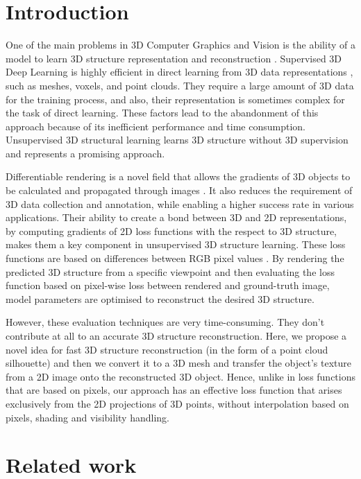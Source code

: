 \documentclass[runningheads]{llncs}
\begin{document}
\section{Introduction}
One of the main problems in 3D Computer Graphics and Vision is the ability of a model to learn 3D structure representation and reconstruction \cite{NIPS2016_1d94108e}. Supervised 3D Deep Learning is highly efficient in direct learning from 3D data representations \cite{ahmed2019survey}, such as meshes, voxels, and point clouds. They require a large amount of 3D data for the training process, and also, their representation is sometimes complex for the task of direct learning. These factors lead to the abandonment of this approach because of its inefficient performance and time consumption. Unsupervised 3D structural learning learns 3D structure without 3D supervision and represents a promising approach.

Differentiable rendering is a novel field that allows the gradients of 3D objects to be calculated and propagated through images \cite{kato2020differentiable}. It also reduces the requirement of 3D data collection and annotation, while enabling a higher success rate in various applications. Their ability to create a bond between 3D and 2D representations, by computing gradients of 2D loss functions with the respect to 3D structure, makes them a key component in unsupervised 3D structure learning. These loss functions are based on differences between RGB pixel values \cite{kumar2010theory}. By rendering the predicted 3D structure from a specific viewpoint and then evaluating the loss function based on pixel-wise loss between rendered and ground-truth image, model parameters are optimised to reconstruct the desired 3D structure.

However, these evaluation techniques are very time-consuming. They don't contribute at all to an accurate 3D structure reconstruction. Here, we propose a novel idea for fast 3D structure reconstruction (in the form of a point cloud silhouette) and then we convert it to a 3D mesh and transfer the object's texture from a 2D image onto the reconstructed 3D object. Hence, unlike in loss functions that are based on pixels, our approach has an effective loss function that arises exclusively from the 2D projections of 3D points, without interpolation based on pixels, shading and visibility handling.


\section{Related work}
\end{document}
